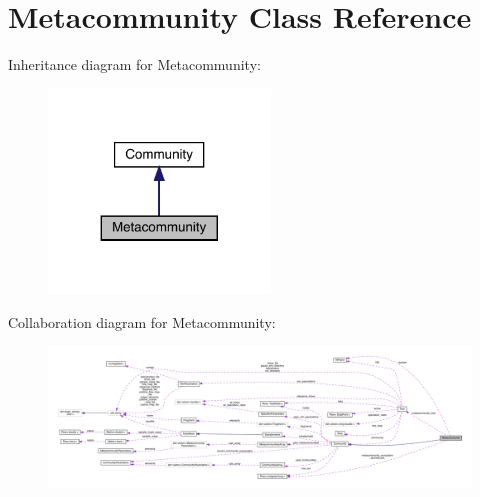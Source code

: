 \hypertarget{class_metacommunity}{}\section{Metacommunity Class Reference}
\label{class_metacommunity}


Inheritance diagram for Metacommunity\+:
\nopagebreak
\begin{figure}[H]
\begin{center}
\leavevmode
\includegraphics[width=167pt]{class_metacommunity__inherit__graph}
\end{center}
\end{figure}


Collaboration diagram for Metacommunity\+:
\nopagebreak
\begin{figure}[H]
\begin{center}
\leavevmode
\includegraphics[width=350pt]{class_metacommunity__coll__graph}
\end{center}
\end{figure}

